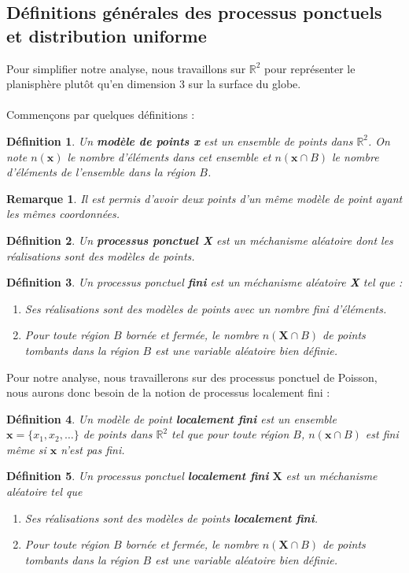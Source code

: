 \documentclass[12pt]{article}
\newcommand{\R}{\mathbb{R}}
\newtheorem*{rmq1}{Remarque}
\newtheorem*{defin1}{Définition}
\begin{document}
\subsection{Définitions générales des processus ponctuels et distribution uniforme}
Pour simplifier notre analyse, nous travaillons sur $\R^2$ pour représenter le planisphère plutôt qu'en dimension 3 sur la surface du globe.\\
\\
Commençons par quelques définitions :

\begin{defin1}
Un \textbf{modèle de points x} est un ensemble de points dans $\R^2$. On note $n(\textbf{x})$ le nombre d'éléments dans cet ensemble et $n(\textbf{x}\cap B)$ le nombre d'éléments de l'ensemble dans la région $B$.
\end{defin1}

\begin{rmq1}
Il est permis d'avoir deux points d'un même modèle de point ayant les mêmes coordonnées.
\end{rmq1}

\begin{defin1}
Un \textbf{processus ponctuel X} est un méchanisme aléatoire dont les réalisations sont des modèles de points.
\end{defin1}

\begin{defin1}
Un processus ponctuel \textbf{fini} est un méchanisme aléatoire \textbf{X} tel que :
\begin{enumerate}
    \item Ses réalisations sont des modèles de points avec un nombre fini d'éléments.
    \item Pour toute région $B$ bornée et fermée, le nombre $n(\textbf{X}\cap B)$ de points tombants dans la région $B$ est une variable aléatoire bien définie.
\end{enumerate}
\end{defin1}
Pour notre analyse, nous travaillerons sur des processus ponctuel de Poisson, nous aurons donc besoin de la notion de processus localement fini :

\begin{defin1}
Un modèle de point \textbf{localement fini} est un ensemble $\textbf{x} = \{x_1,x_2,\dots\}$ de points dans $\R^2$ tel que pour toute région $B$, $n(\textbf{x}\cap B)$ est fini même si $\textbf{x}$ n'est pas fini.
\end{defin1}

\begin{defin1}
Un processus ponctuel \textbf{localement fini} $\textbf{X}$ est un méchanisme aléatoire tel que
\begin{enumerate}
    \item Ses réalisations sont des modèles de points \textbf{localement fini}.
    \item Pour toute région $B$ bornée et fermée, le nombre $n(\textbf{X}\cap B)$ de points tombants dans la région $B$ est une variable aléatoire bien définie.
\end{enumerate}
\end{defin1}
\end{document}
